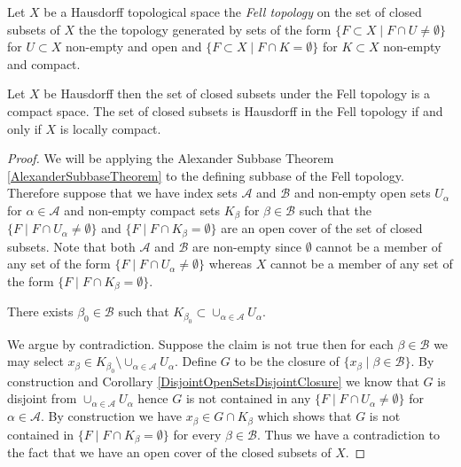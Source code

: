 \begin{defn}Let $X$ be a Hausdorff topological space the \emph{Fell topology} on the set of closed subsets of $X$ the the topology generated by sets of the form
$\lbrace F \subset X \mid F \cap U \neq \emptyset \rbrace$ for $U \subset X$ non-empty and open and $\lbrace F \subset X \mid F \cap K = \emptyset \rbrace$ for $K \subset X$ non-empty and compact.
\end{defn}

\begin{thm}\label{CompactnessOfFellTopology}Let $X$ be Hausdorff then the set of closed subsets under the Fell topology is a compact space.  The set of closed subsets is Hausdorff in the Fell topology if and only if $X$ is locally compact.
\end{thm}
\begin{proof}
We will be applying the Alexander Subbase Theorem \ref{AlexanderSubbaseTheorem} to the defining subbase of the Fell topology.  Therefore suppose that we have index sets $\mathcal{A}$ and $\mathcal{B}$ and non-empty open sets $U_\alpha$ for $\alpha \in \mathcal{A}$ and non-empty compact sets $K_\beta$ for $\beta \in \mathcal{B}$ such that the $\lbrace F \mid F \cap U_\alpha \neq \emptyset \rbrace$
and  $\lbrace F \mid F \cap K_\beta = \emptyset \rbrace$ are an open cover of the set of closed subsets.  Note that both $\mathcal{A}$ and $\mathcal{B}$ are non-empty since $\emptyset$ cannot be a member of any set of the form $\lbrace F \mid F \cap U_\alpha \neq \emptyset \rbrace$ whereas $X$ cannot be a member of any set of the form $\lbrace F \mid F \cap K_\beta = \emptyset \rbrace$.

\begin{clm}There exists $\beta_0 \in \mathcal{B}$ such that $K_{\beta_0} \subset \cup_{\alpha \in \mathcal{A}} U_\alpha$.
\end{clm}
We argue by contradiction.  Suppose the claim is not true then for each $\beta \in \mathcal{B}$ we may select $x_\beta \in K_{\beta_0} \setminus \cup_{\alpha \in \mathcal{A}} U_\alpha$.  Define $G$
to be the closure of $\lbrace x_\beta \mid \beta \in \mathcal{B} \rbrace$.  By construction and Corollary \ref{DisjointOpenSetsDisjointClosure} we know that $G$ is disjoint from $\cup_{\alpha \in \mathcal{A}} U_\alpha$ hence $G$ is not contained in any $\lbrace F \mid F \cap U_\alpha \neq \emptyset \rbrace$ for $\alpha \in \mathcal{A}$.  By construction we have $x_\beta \in G \cap K_\beta$ which
shows that $G$ is not contained in $\lbrace F \mid F \cap K_\beta = \emptyset \rbrace$ for every $\beta \in \mathcal{B}$.  Thus we have a contradiction to the fact that we have an open cover of the closed subsets of $X$.


\end{proof}
